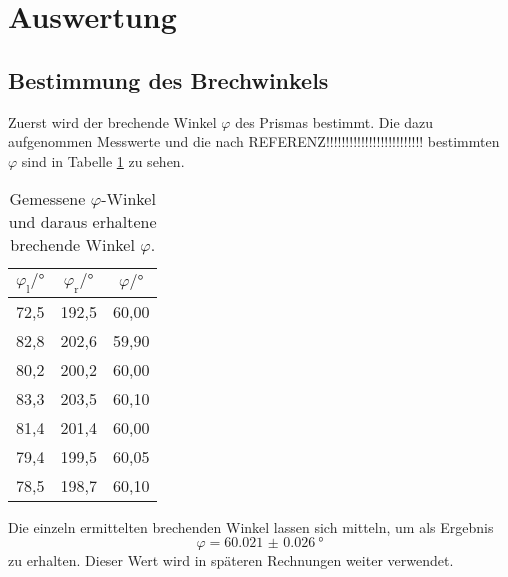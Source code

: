 \section{Auswertung}
\label{sec:Auswertung}
\subsection{Bestimmung des Brechwinkels}
\label{subsec:brechwinkel}
Zuerst wird der brechende Winkel $\varphi$ des Prismas bestimmt.
Die dazu aufgenommen Messwerte und die nach REFERENZ!!!!!!!!!!!!!!!!!!!!!!!!!
bestimmten $\varphi$ sind in Tabelle \ref{tab:phi} zu sehen.

\begin{table}[htp]
	\begin{center}
    \caption{Gemessene $\varphi$-Winkel und daraus erhaltene brechende Winkel $\varphi$.}
    \label{tab:phi}
		\begin{tabular}{ccc}
		\toprule
			{$\varphi_\text{l}/°$} & {$\varphi_\text{r}/°$} & {$\varphi/°$} \\
			\midrule
      72,5 & 192,5 & 60,00 \\
      82,8 & 202,6 & 59,90 \\
      80,2 & 200,2 & 60,00 \\
      83,3 & 203,5 & 60,10 \\
      81,4 & 201,4 & 60,00 \\
      79,4 & 199,5 & 60,05 \\
      78,5 & 198,7 & 60,10 \\
		\bottomrule
		\end{tabular}
	\end{center}
\end{table}

Die einzeln ermittelten brechenden Winkel lassen sich mitteln, um als Ergebnis
\begin{equation*}
  \varphi = \SI{60.021(26)}{\degree}
\end{equation*}
zu erhalten. Dieser Wert wird in späteren Rechnungen weiter verwendet.

